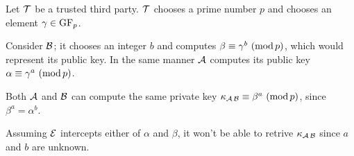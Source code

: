 \documentclass{subfiles}
\begin{document}
    \begin{procedure}
        \caption{Diffie-Hellman-Key-Exchange()}\label{proc:DH-exchange}
        \nl Let $\operatorname{\mathcal{T}}$ be a trusted third party. 
            $\operatorname{\mathcal{T}}$ chooses a prime number $p$ and chooses an element $\gamma \in \operatorname{GF}_{p}$.
            \DontPrintSemicolon\;

        \nl Consider $\operatorname{\mathcal{B}}$; it chooses an integer $b$ and computes $\beta \equiv \gamma^{b} \mod$,
            which would represent its public key.
            In the same manner $\operatorname{\mathcal{A}}$ computes its public key $\alpha \equiv \gamma^{a} \mod$.
            \DontPrintSemicolon\;

        \nl Both $\operatorname{\mathcal{A}}$ and $\operatorname{\mathcal{B}}$ can compute the same private key $\kappa_{\A\B} \equiv \beta^{a} \mod$, 
            since $\beta^{a} = \alpha^{b}$.
            \DontPrintSemicolon\;

        \nl Assuming $\operatorname{\mathcal{E}}$ intercepts either of $\alpha$ and $\beta$,
            it won't be able to retrive $\kappa_{\operatorname{\mathcal{A}}\operatorname{\mathcal{B}}}$ since $a$ and $b$ are unknown.
    \end{procedure}
\end{document}
